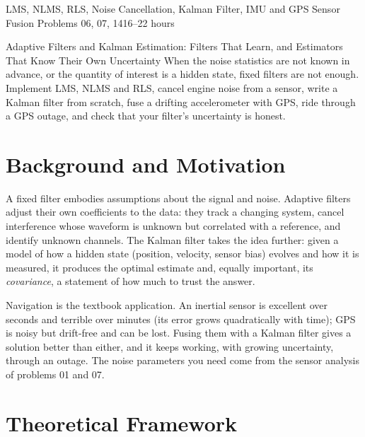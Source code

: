 \documentclass[11pt,a4paper]{article}
\begin{document}
%
{LMS, NLMS, RLS, Noise Cancellation, Kalman Filter, IMU and GPS Sensor Fusion}%
{Problems 06, 07, 14}{16--22 hours}

\begin{summarybox}{Adaptive Filters and Kalman Estimation: Filters That Learn, and Estimators That Know Their Own Uncertainty}
When the noise statistics are not known in advance, or the quantity of interest is a hidden state, fixed filters are not enough. Implement LMS, NLMS and RLS, cancel engine noise from a sensor, write a Kalman filter from scratch, fuse a drifting accelerometer with GPS, ride through a GPS outage, and check that your filter's uncertainty is honest.
\end{summarybox}


\section*{Background and Motivation}
A fixed filter embodies assumptions about the signal and noise. Adaptive filters adjust their own coefficients to the data: they track a changing system, cancel interference whose waveform is unknown but correlated with a reference, and identify unknown channels. The Kalman filter takes the idea further: given a model of how a hidden state (position, velocity, sensor bias) evolves and how it is measured, it produces the optimal estimate and, equally important, its \emph{covariance}, a statement of how much to trust the answer.

Navigation is the textbook application. An inertial sensor is excellent over seconds and terrible over minutes (its error grows quadratically with time); GPS is noisy but drift-free and can be lost. Fusing them with a Kalman filter gives a solution better than either, and it keeps working, with growing uncertainty, through an outage. The noise parameters you need come from the sensor analysis of problems 01 and 07.

\section*{Theoretical Framework}
\end{document}
